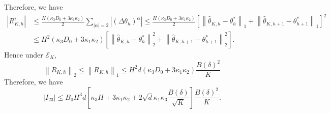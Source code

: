 \documentclass{article}
\numberwithin{equation}{section}
\theoremstyle{plain}
\theoremstyle{definition}
\theoremstyle{remark}
\begin{document}
Therefore, we have
\begin{align*}
    \left|R_{K,h}^i\right| 
    &\leq \frac{H(\kappa_3 D_0 + 3 \kappa_1 \kappa_2)}{2} \sum_{\left|\alpha\right| = 2} \left|\left(\Delta \theta_h\right)^\alpha\right| 
    \leq \frac{H(\kappa_3 D_0 + 3 \kappa_1 \kappa_2)}{2} \left[\left\|\widehat{\theta}_{K,h} - \theta_h^*\right\|_1 + \left\|\widehat{\theta}_{K,h+1} - \theta_{h+1}^*\right\|_1\right]^2 \\
    & \leq H^2(\kappa_3 D_0 + 3 \kappa_1 \kappa_2) \left[\left\|\widehat{\theta}_{K,h} - \theta_h^*\right\|_2^2 + \left\|\widehat{\theta}_{K,h+1} - \theta_{h+1}^*\right\|_2^2\right].
\end{align*}
Hence under $\mathcal{E}_K,$
\begin{equation*}
    \left\|R_{K,h}\right\|_2 \leq \left\|R_{K,h}\right\|_1 \leq H^2 d (\kappa_3 D_0 + 3 \kappa_1 \kappa_2) \frac{B(\delta)^2}{K}
\end{equation*}
Therefore, we have
\begin{equation*}
    \left|I_{23}\right| \leq B_0 H^3 d \left[\kappa_3 H + 3 \kappa_1 \kappa_2 + 2\sqrt{d} \kappa_1 \kappa_3 \frac{B(\delta)}{\sqrt{K}} \right]\frac{B(\delta)^2}{K}.
\end{equation*}
\end{document}
